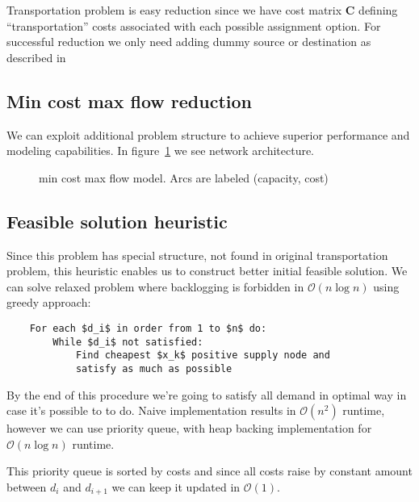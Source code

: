 Transportation problem \autocite{or-textbook} is easy reduction since we have cost matrix $\mathbf{C}$ defining ``transportation'' costs associated with each possible assignment option. For successful reduction we only need adding dummy source or destination as described in \autocite{or-textbook}


\subsection{Min cost max flow reduction}
\label{sub:Min cost max flow reduction}

We can exploit additional problem structure to achieve superior performance and modeling capabilities. In figure~\ref{fig:mcmf-model} we see network architecture.

\begin{figure}[h]
    \label{fig:mcmf-model}
    \centering
    
    \caption{min cost max flow model. Arcs are labeled (capacity, cost)}
\end{figure}

\subsection{Feasible solution heuristic}
\label{subs:Feasible solution heuristic}
Since this problem has special structure, not found in original transportation problem, this heuristic enables us to construct better initial feasible solution. We can solve relaxed problem where backlogging is forbidden in $\mathcal{O}(n \log{} n)$ using greedy approach:

\begin{verbatim}
    For each $d_i$ in order from 1 to $n$ do:
        While $d_i$ not satisfied:
            Find cheapest $x_k$ positive supply node and
            satisfy as much as possible
\end{verbatim}

By the end of this procedure we're going to satisfy all demand in optimal way in case it's possible to to do. Naive implementation results in $\mathcal{O}(n^2)$ runtime, however we can use priority queue, with heap backing implementation for $\mathcal{O}(n\log{}n)$ runtime.

This priority queue is sorted by costs and since all costs raise by constant amount between $d_i$ and $d_{i+1}$ we can keep it updated in $\mathcal{O}(1)$.

